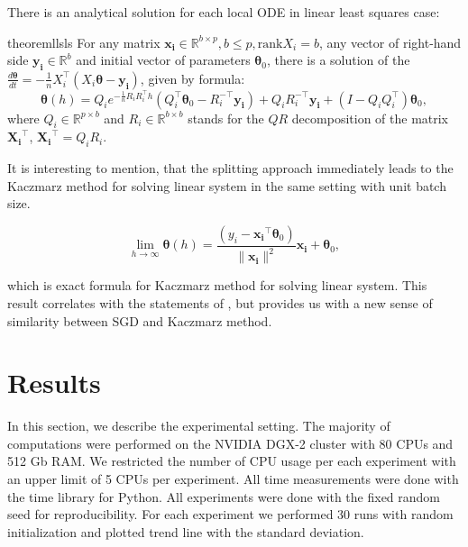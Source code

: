 \documentclass{article}
\newcommand{\vect}[1]{\boldsymbol{\mathbf{#1}}}
\begin{document}
There is an analytical solution for each local ODE in linear least squares case:

\begin{restatable}{theorem}{llsls}\label{strang:LLS_local_solution} For any matrix $\vect{x_i} \in \mathbb{R}^{b \times p}, b \leq p, \text{rank}X_i = b$, any vector of right-hand side $\vect{y_i} \in \mathbb{R}^{b}$ and initial vector of parameters $\vect{\theta}_0$, there is a solution of the $\frac{d \vect{\theta}}{d t} = - \frac{1}{n} X_i^\top( X_i \vect{\theta} - \vect{y_i})$, given by formula:
\begin{equation}\label{strang:LLS_local_solution_formula}
\vect{\theta}(h) = Q_i e^{-\frac{1}{n}R_iR_i^\top h} \left( Q_i^\top \vect{\theta}_0 - R_i^{-\top}\vect{y_i}\right) + Q_iR_i^{-\top}\vect{y_i} + (I - Q_iQ_i^\top)\vect{\theta}_0,
\end{equation}
where $Q_i \in \mathbb{R}^{p \times b}$ and $R_i \in \mathbb{R}^{b \times b}$ stands for the $QR$ decomposition of the matrix $\vect{X_i}^\top$, $\vect{X_i}^\top = Q_i R_i$.
\end{restatable}

It is interesting to mention, that the splitting approach immediately leads to the Kaczmarz \cite{kaczmarz1937method, strohmer2009randomized, gower2015randomized} method for solving linear system in the same setting with unit batch size.

\begin{equation}
\label{strang:splitting_limit_kaczmarz}
\lim_{h \to \infty} \vect{\theta}(h) = \frac{\left(y_i - \vect{x_i}^\top\vect{\theta}_0 \right)}{\|\vect{x_i}\|^2} \vect{x_i} + \vect{\theta}_0,
\end{equation}

which is exact formula for Kaczmarz method for solving linear system. This result correlates with the statements of \cite{needell2014stochastic}, but provides us with a new sense of similarity between SGD and Kaczmarz method.


\section{Results}

In this section, we describe the experimental setting. The majority of computations were performed on the NVIDIA DGX-2 cluster with 80 CPUs and 512 Gb RAM. We restricted the number of CPU usage per each experiment with an upper limit of 5 CPUs per experiment. All time measurements were done with the time library for Python. All experiments were done with the fixed random seed for reproducibility. For each experiment we performed 30 runs with random initialization and plotted trend line with the standard deviation.
\end{document}
